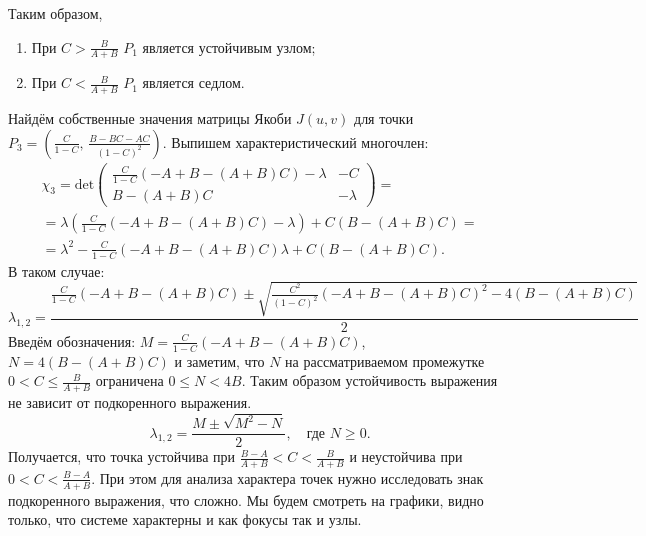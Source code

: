 \documentclass[a4paper, 11pt]{article}
\begin{document}
        Таким образом,
        \begin{enumerate}
                \item При $C > \frac{B}{A+B}$ $P_1$ является устойчивым узлом;
                \item При $C < \frac{B}{A+B}$ $P_1$ является седлом.
        \end{enumerate}

        Найдём собственные значения матрицы Якоби $J(u,v)$ для точки $P_3=\left(\frac{C}{1 - C},\, \frac{B - BC - AC}{(1 - C)^2}\right)$. Выпишем характеристический многочлен:
        \begin{multline*}
                \chi_3 = \mathrm{det}\begin{pmatrix}
                        \frac{C}{1-C}(-A + B - (A+B) C) - \lambda
                        &
                        -C
                        \\
                        B - (A+B)C
                        &
                        -\lambda
                \end{pmatrix}
                =\\=
                \lambda\left(\frac{C}{1-C}(-A + B - (A+B)C) - \lambda\right) + C(B - (A+B)C) 
                =\\=
                \lambda^2 - \frac{C}{1-C}(-A + B - (A + B)C)\lambda + C(B - (A+B)C).
        \end{multline*}
        В таком случае:
        $$
                \lambda_{1,2} = \frac{\frac{C}{1-C}(-A + B - (A+B)C) \pm \sqrt{\frac{C^2}{(1-C)^2}(-A+B-(A+B)C)^2 - 4(B-(A+B)C)}}{2}
        $$
        Введём обозначения: $M = \frac{C}{1-C}(-A + B - (A+B)C)$, $N = 4(B-(A+B)C)$ и заметим, что $N$ на рассматриваемом промежутке $0 < C \leqslant \frac{B}{A+B}$ ограничена $0 \leqslant N < 4B$. Таким образом устойчивость выражения не зависит от подкоренного выражения.
        $$
                \lambda_{1,2} = \frac{M \pm \sqrt{M^2 - N}}{2}, \quad \mbox{где } N\geqslant0.
        $$
        Получается, что точка устойчива при $\frac{B-A}{A+B} < C < \frac{B}{A+B}$ и неустойчива при $0 < C < \frac{B-A}{A+B}$. При этом для анализа характера точек нужно исследовать знак подкоренного выражения, что сложно. Мы будем смотреть на графики, видно только, что системе характерны и как фокусы так и узлы. 
\end{document}
